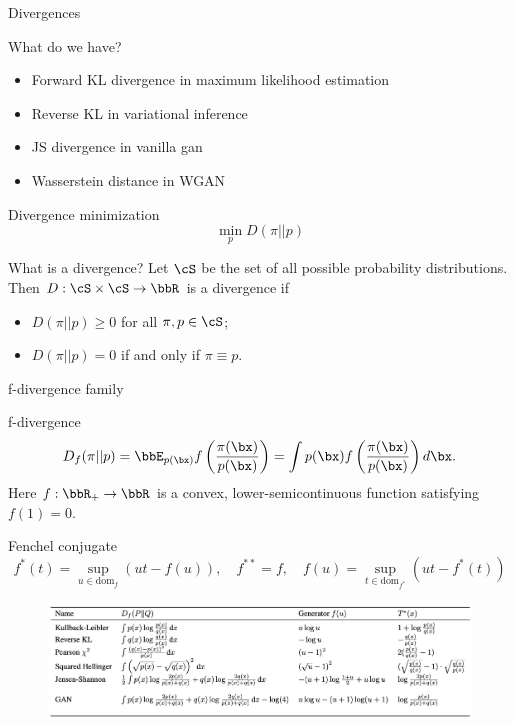 \begin{frame}{Divergences}
	\begin{block}{What do we have?}
		\begin{itemize}
			\item Forward KL divergence in maximum likelihood estimation
			\item Reverse KL in variational inference
			\item JS divergence in  vanilla gan
			\item Wasserstein distance in WGAN
		\end{itemize}
	\end{block}
	\begin{block}{Divergence minimization}
		\vspace{-0.3cm}
		\[
			\min_p D(\pi || p)
		\]
		\vspace{-0.5cm}
	\end{block}
	\begin{block}{What is a divergence?}
		Let $\cS$ be the set of all possible probability distributions. Then $D: \cS \times \cS \rightarrow \bbR$ is a divergence if 
		\begin{itemize}
			\item $D(\pi || p) \geq 0$ for all $\pi, p \in \cS$;
			\item $D(\pi || p) = 0$ if and only if $\pi \equiv p$.
		\end{itemize}
	\end{block}
\end{frame}
\begin{frame}{f-divergence family}
	
	\begin{block}{f-divergence}
		\vspace{-0.3cm}
		\[
		D_f(\pi || p) = \bbE_{p(\bx)}  f\left( \frac{\pi(\bx)}{p(\bx)} \right)  = \int p(\bx) f\left( \frac{\pi(\bx)}{p(\bx)} \right) d \bx.
		\]
		Here $f: \bbR_+ \rightarrow \bbR$ is a convex, lower-semicontinuous function satisfying $f(1) = 0$.
	\end{block}
	\begin{block}{Fenchel conjugate}
		\vspace{-0.5cm}
		\[
		f^*(t) = \sup_{u \in \text{dom}_f} \left( ut - f(u) \right), \quad f^{**} = f, \quad f(u) = \sup_{t \in \text{dom}_{f^*}} \left( ut - f^*(t) \right)
		\]
		\vspace{-0.5cm}
	\end{block}
	\begin{figure}
		\centering
		\includegraphics[width=0.85\linewidth]{figs/f_divs}
	\end{figure}
\end{frame}
